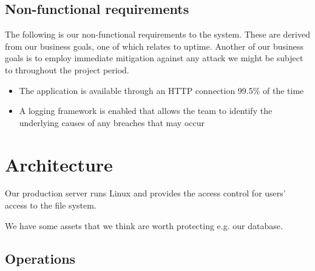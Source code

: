 \documentclass[a4paper]{article}
\begin{document}
\subsection{Non-functional requirements}
The following is our non-functional requirements to the system. These are derived from our business goals, one of which relates to uptime. Another of our business goals is to employ immediate mitigation against any attack we might be subject to throughout the project period.
\begin{itemize}
\item The application is available through an HTTP connection 99.5\% of the time
\item A logging framework is enabled that allows the team to identify the underlying causes of any breaches that may occur
\end{itemize}


\section{Architecture}

Our production server runs Linux and provides the access control for users' access to the file system.

We have some assets that we think are worth protecting e.g. our database. 

\subsection{Operations}
\end{document}
